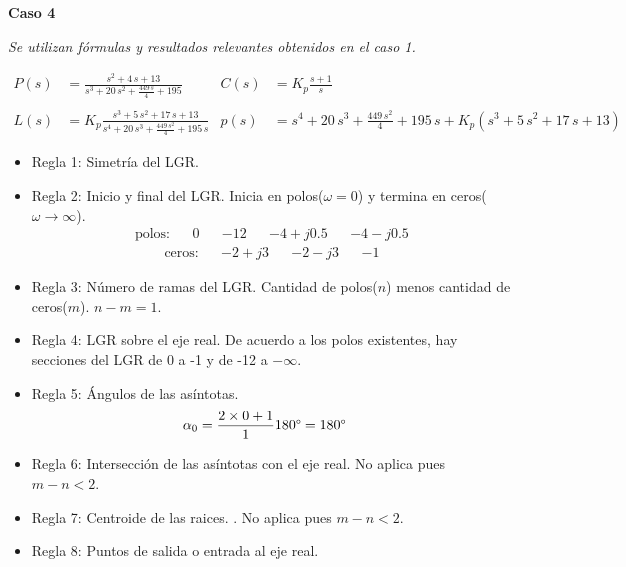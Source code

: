 \textbf{Caso 4}

\textit{Se utilizan fórmulas y resultados relevantes obtenidos en el caso 1.}

\begin{align*}
  P(s) &= 
  \frac{s^2+4\,s+13}{s^3+20\,s^2+\frac{449\,s}{4}+195}
  &
  C(s) &= K_p
  \frac{s+1}{s}
  \\\\
  L(s) &= K_p
  \frac{s^3+5\,s^2+17\,s+13}{s^4+20\,s^3+\frac{449\,s^2}{4}+195\,s}
  &
  p(s) &= 
  s^4+20\,s^3+\frac{449\,s^2}{4}+195\,s + K_p(s^3+5\,s^2+17\,s+13)
\end{align*}
\begin{itemize}
  \item Regla 1: Simetría del LGR.
  \item Regla 2: Inicio y final del LGR. Inicia en polos($\omega = 0$) y termina en ceros($\omega \rightarrow \infty$).
  \begin{align*}
    \text{polos:} && 0 && -12 && -4 + j0.5 && -4 - j0.5
  \end{align*}
  \begin{align*}
    \text{ceros:} && -2 + j3 && -2 - j3 && -1
  \end{align*}
  \item Regla 3: Número de ramas del LGR. Cantidad de polos($n$) menos cantidad de ceros($m$). $n-m = 1$.
  \item Regla 4: LGR sobre el eje real. 
  De acuerdo a los polos existentes, hay secciones del LGR de 0 a -1 y  de -12 a $-\infty$.
  \item Regla 5: Ángulos de las asíntotas.
  \begin{align*}
    \alpha_0 &= \frac{2\times0 + 1}{1}  180\degree  = 180\degree
  \end{align*}
  \item Regla 6: Intersección de las asíntotas con el eje real. No aplica pues $m-n<2$.
  \item Regla 7: Centroide de las raices. . No aplica pues $m-n<2$.
  \item Regla 8: Puntos de salida o entrada al eje real.


\end{itemize}
